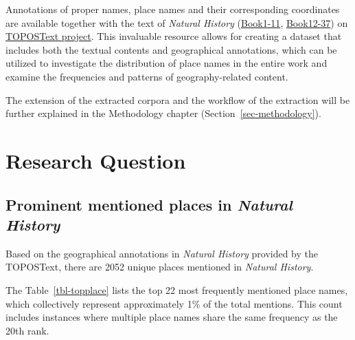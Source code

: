 \documentclass[
  12pt,
]{article}
\begin{document}
Annotations of proper names, place names and their corresponding
coordinates are available together with the text of \emph{Natural
History} (\href{https://topostext.org/work/148}{Book1-11},
\href{https://topostext.org/work/153}{Book12-37}) on
\href{https://topostext.org/the-project}{TOPOSText project}. This
invaluable resource allows for creating a dataset that includes both the
textual contents and geographical annotations, which can be utilized to
investigate the distribution of place names in the entire work and
examine the frequencies and patterns of geography-related content.

The extension of the extracted corpora and the workflow of the
extraction will be further explained in the Methodology chapter
(Section~\ref{sec-methodology}).

\newpage

\hypertarget{sec-research_question}{%
\section{Research Question}\label{sec-research_question}}

\hypertarget{prominent-mentioned-places-in-natural-history}{%
\subsection{\texorpdfstring{Prominent mentioned places in \emph{Natural
History}}{Prominent mentioned places in Natural History}}\label{prominent-mentioned-places-in-natural-history}}

Based on the geographical annotations in \emph{Natural History} provided
by the TOPOSText, there are 2052 unique places mentioned in
\emph{Natural History}.

The Table~\ref{tbl-topplace} lists the top 22 most frequently mentioned
place names, which collectively represent approximately 1\% of the total
mentions. This count includes instances where multiple place names share
the same frequency as the 20th rank.
\end{document}
